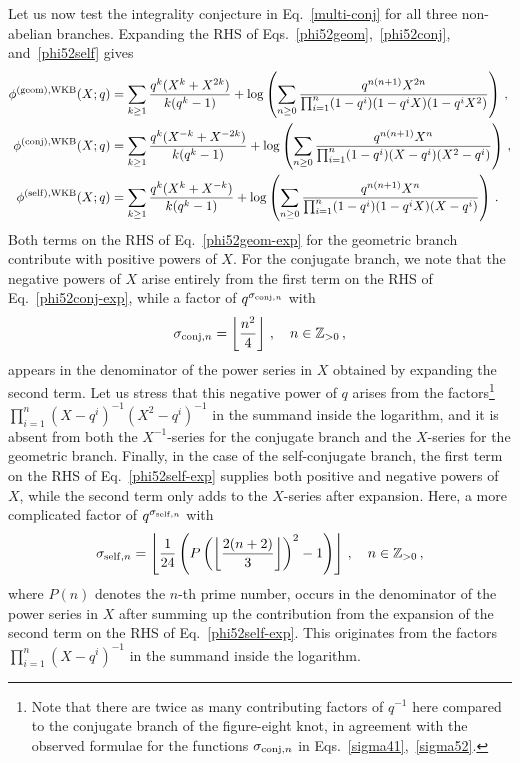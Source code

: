 \documentclass[a4paper,11pt]{article}
\theoremstyle{definition}
\def\IZ{{\mathbb Z}}
\newcommand{\be}{\begin{equation}}
\newcommand{\ee}{\end{equation}}
\begin{document}
Let us now test the integrality conjecture in Eq.~\eqref{multi-conj} for all three non-abelian branches. 
Expanding the RHS of Eqs.~\eqref{phi52geom},~\eqref{phi52conj}, and~\eqref{phi52self} gives
\begin{subequations}
\begin{align}
  \phi^{(\rm{geom}), \rm{WKB}}(X;q)& = \sum_{k \ge 1} \frac{q^k (X^k+X^{2k})}{k(q^k-1)} + \log \left(\sum_{n \ge 0} \frac{q^{n(n+1)} X^{2n}}{\prod_{i=1}^n (1-q^i) (1-q^i X)(1-q^i X^2)} \right)  \, , \label{phi52geom-exp}\\
  \phi^{(\rm{conj}), \rm{WKB}}(X;q) &=  \sum_{k \ge 1} \frac{q^k (X^{-k}+X^{-2k})}{k(q^k-1)} + \log \left(\sum_{n \ge 0} \frac{q^{n(n+1)} X^{n}}{\prod_{i=1}^n (1-q^i) (X-q^i)(X^2-q^i)} \right)  \, , \label{phi52conj-exp}\\
  \phi^{(\rm{self}), \rm{WKB}}(X;q) &=  \sum_{k \ge 1} \frac{q^k (X^k+X^{-k})}{k(q^k-1)} + \log \left(\sum_{n \ge 0} \frac{q^{n(n+1)} X^{n}}{\prod_{i=1}^n (1-q^i) (1-q^i X)(X-q^i)} \right)  \, . \label{phi52self-exp}
\end{align}
\end{subequations}
%
Both terms on the RHS of Eq.~\eqref{phi52geom-exp} for the geometric branch contribute with positive powers of $X$.
For the conjugate branch, we note that the negative powers of $X$ arise entirely from the first term on the RHS of Eq.~\eqref{phi52conj-exp}, while a factor of $q^{\sigma_{{\rm conj}, n}}$ with
\be \label{sigma52}
\sigma_{{\rm conj}, n} = \left\lfloor \frac{n^2}{4} \right\rfloor \, , \quad n \in \IZ_{>0} \, ,
\ee
appears in the denominator of the power series in $X$ obtained by expanding 
the second term. Let us stress that this negative power of $q$ arises from the 
factors\footnote{Note that there are twice as many contributing factors of $q^{-1}$ here compared to the conjugate branch of the figure-eight knot, in agreement with the observed formulae for the functions $\sigma_{{\rm conj}, n}$ in Eqs.~\eqref{sigma41},~\eqref{sigma52}.} $\prod_{i=1}^n(X-q^i)^{-1}(X^2-q^i)^{-1}$ in the summand inside the logarithm, and it is absent from both the $X^{-1}$-series for the conjugate branch and the $X$-series 
for the geometric branch.
Finally, in the case of the self-conjugate branch, the first term on the RHS 
of Eq.~\eqref{phi52self-exp} supplies both positive and negative powers of $X$, 
while the second term only adds to the $X$-series after expansion. Here, a more 
complicated factor of $q^{\sigma_{{\rm self}, n}}$ with
\be \label{sigma52self}
\sigma_{{\rm self}, n} = \left\lfloor \frac{1}{24} \left(P \left(\left\lfloor \frac{2 (n+2)}{3} 
\right\rfloor \right)^2-1 \right) \right\rfloor \, , \quad n \in \IZ_{>0} \, ,
\ee
where $P(n)$ denotes the $n$-th prime number, occurs in the denominator of the power series in $X$ after summing up the contribution from the expansion of the second term on the RHS of Eq.~\eqref{phi52self-exp}. 
This originates from the factors $\prod_{i=1}^n(X-q^i)^{-1}$ in the summand inside the logarithm.
\end{document}
